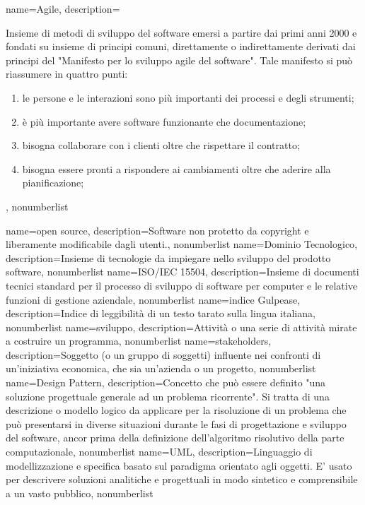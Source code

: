 {
	name={Agile},
	description={Insieme di metodi di sviluppo del software emersi a partire dai
		primi anni 2000 e fondati su insieme di principi comuni, direttamente o
		indirettamente derivati dai principi del "Manifesto per lo sviluppo agile del
		software". Tale manifesto si può riassumere in quattro punti:
		\begin{enumerate}
			\item le persone e le interazioni sono più importanti dei processi e degli strumenti;
			\item è più importante avere software funzionante che documentazione;
			\item bisogna collaborare con i clienti oltre che rispettare il contratto;
			\item bisogna essere pronti a rispondere ai cambiamenti oltre che aderire alla pianificazione;
		\end{enumerate}
	},
	nonumberlist
}
{
	name={open source},
	description={Software non protetto da copyright e liberamente modificabile dagli utenti.},
	nonumberlist
}
{
	name={Dominio Tecnologico},
	description={Insieme di tecnologie da impiegare nello sviluppo del prodotto software},
	nonumberlist
}
{
	name={ISO/IEC 15504},
	description={Insieme di documenti tecnici standard per il processo di sviluppo di software per computer e le relative funzioni di gestione aziendale},
	nonumberlist
}
{
	name={indice Gulpease},
	description={Indice di leggibilità di un testo tarato sulla lingua italiana},
	nonumberlist
}
{
	name={sviluppo},
	description={Attività o una serie di attività mirate a costruire un programma},
	nonumberlist
}
{
	name={stakeholders},
	description={Soggetto (o un gruppo di soggetti) influente nei confronti di un'iniziativa economica, che sia un'azienda o un progetto},
	nonumberlist
}
{
	name={Design Pattern},
	description={Concetto che può essere definito "una soluzione progettuale generale ad un problema ricorrente". Si tratta di una descrizione o modello logico da applicare per la risoluzione di un problema che può presentarsi in diverse situazioni durante le fasi di progettazione e sviluppo del software, ancor prima della definizione dell'algoritmo risolutivo della parte computazionale},
	nonumberlist
}
{
	name={UML},
	description={Linguaggio di modellizzazione e specifica basato sul paradigma orientato agli oggetti. E' usato per descrivere soluzioni analitiche e progettuali in modo sintetico e comprensibile a un vasto pubblico},
	nonumberlist
}
